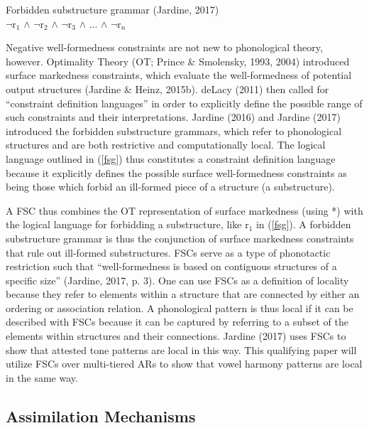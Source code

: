 \documentclass[,doc,floatsintext]{apa6}
\theoremstyle{definition}
\theoremstyle{definition}
\theoremstyle{definition}
\theoremstyle{remark}
\begin{document}
\begin{exe}
\ex Forbidden substructure grammar (Jardine, 2017) \label{fsg} \\
$\neg$r$_1$ $\wedge$ $\neg$r$_2$ $\wedge$ $\neg$r$_3$ $\wedge$ ... $\wedge$ $\neg$r$_n$
\end{exe}

Negative well-formedness constraints are not new to phonological theory,
however. Optimality Theory (OT; Prince \& Smolensky, 1993, 2004)
introduced surface markedness constraints, which evaluate the
well-formedness of potential output structures (Jardine \& Heinz,
2015b). deLacy (2011) then called for \enquote{constraint definition
languages} in order to explicitly define the possible range of such
constraints and their interpretations. Jardine (2016) and Jardine (2017)
introduced the forbidden substructure grammars, which refer to
phonological structures and are both restrictive and computationally
local. The logical language outlined in (\ref{fsg}) thus constitutes a
constraint definition language because it explicitly defines the
possible surface well-formedness constraints as being those which forbid
an ill-formed piece of a structure (a substructure).

A FSC thus combines the OT representation of surface markedness (using
*) with the logical language for forbidding a substructure, like r\(_1\)
in (\ref{fsg}). A forbidden substructure grammar is thus the conjunction
of surface markedness constraints that rule out ill-formed
substructures. FSCs serve as a type of phonotactic restriction such that
\enquote{well-formedness is based on contiguous structures of a specific
size} (Jardine, 2017, p. 3). One can use FSCs as a definition of
locality because they refer to elements within a structure that are
connected by either an ordering or association relation. A phonological
pattern is thus local if it can be described with FSCs because it can be
captured by referring to a subset of the elements within structures and
their connections. Jardine (2017) uses FSCs to show that attested tone
patterns are local in this way. This qualifying paper will utilize FSCs
over multi-tiered ARs to show that vowel harmony patterns are local in
the same way.

\subsection{Assimilation Mechanisms}\label{assimilation-mechanisms}
\end{document}
